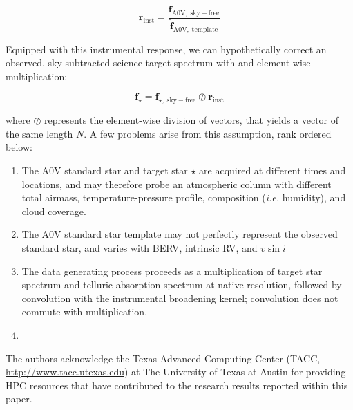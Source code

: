 \documentclass[modern]{aastex631}
\begin{document}
\begin{equation}
  \mathbf{r}_{\mathrm{inst}} = \frac{\mathbf{f}_{\mathrm{A0V,\;sky-free}}}{\mathbf{\hat{f}}_{\mathrm{A0V,\;template}}}
\end{equation}

Equipped with this instrumental response, we can hypothetically correct an observed, sky-subtracted science target spectrum with and element-wise multiplication:

\begin{equation}
  \mathbf{f}_{\mathrm{\star}} = \mathbf{f}_{\mathrm{\star,\;sky-free}} \oslash \mathbf{r}_{\mathrm{inst}}
\end{equation}

where $\oslash$ represents the element-wise division of vectors, that yields a vector of the same length $N$.  A few problems arise from this assumption, rank ordered below:

\begin{enumerate}
  \item The A0V standard star and target star $\star$ are acquired at different times and locations, and may therefore probe an atmospheric column with different total airmass, temperature-pressure profile, composition (\emph{i.e.} humidity), and cloud coverage.
  \item The A0V standard star template may not perfectly represent the observed standard star, and varies with BERV, intrinsic RV, and $v\sin{i}$
  \item The data generating process proceeds as a multiplication of target star spectrum and telluric absorption spectrum at native resolution, followed by convolution with the instrumental broadening kernel; convolution does not commute with multiplication.
  \item 
\end{enumerate}



\begin{acknowledgements}

The authors acknowledge the Texas Advanced Computing Center (TACC, \url{http://www.tacc.utexas.edu}) at The University of Texas at Austin for providing HPC resources that have contributed to the research results reported within this paper.
\end{acknowledgements}

\clearpage






\end{document}
